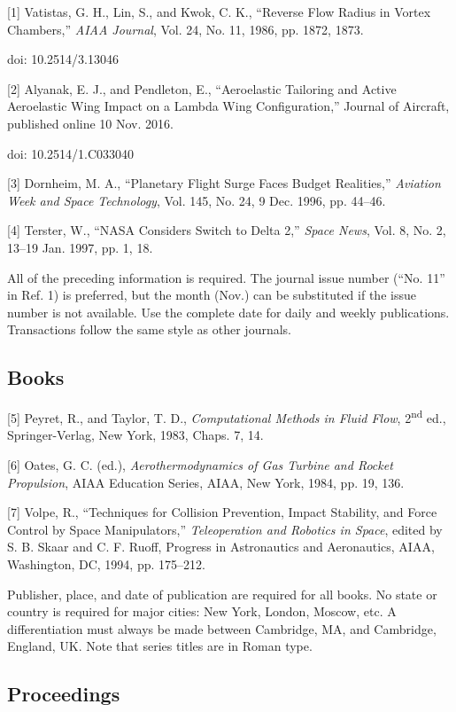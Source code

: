 \documentclass[
]{article}
\begin{document}
{[}1{]} Vatistas, G. H., Lin, S., and Kwok, C. K., ``Reverse Flow Radius
in Vortex Chambers,'' \emph{AIAA Journal}, Vol. 24, No. 11, 1986, pp.
1872, 1873.

doi: 10.2514/3.13046

{[}2{]} Alyanak, E. J., and Pendleton, E., ``Aeroelastic Tailoring and
Active Aeroelastic Wing Impact on a Lambda Wing Configuration,'' Journal
of Aircraft, published online 10 Nov. 2016.

doi: 10.2514/1.C033040

{[}3{]} Dornheim, M. A., ``Planetary Flight Surge Faces Budget
Realities,'' \emph{Aviation Week and Space Technology}, Vol. 145, No.
24, 9 Dec. 1996, pp. 44--46.

{[}4{]} Terster, W., ``NASA Considers Switch to Delta 2,'' \emph{Space
News}, Vol. 8, No. 2, 13--19 Jan. 1997, pp. 1, 18.

All of the preceding information is required. The journal issue number
(``No. 11'' in Ref. 1) is preferred, but the month (Nov.) can be
substituted if the issue number is not available. Use the complete date
for daily and weekly publications. Transactions follow the same style as
other journals.

\subsection{Books}\label{books}

{[}5{]} Peyret, R., and Taylor, T. D., \emph{Computational Methods in
Fluid Flow}, 2\textsuperscript{nd} ed., Springer-Verlag, New York, 1983,
Chaps. 7, 14.

{[}6{]} Oates, G. C. (ed.), \emph{Aerothermodynamics of Gas Turbine and
Rocket Propulsion}, AIAA Education Series, AIAA, New York, 1984, pp. 19,
136.

{[}7{]} Volpe, R., ``Techniques for Collision Prevention, Impact
Stability, and Force Control by Space Manipulators,''
\emph{Teleoperation and Robotics in Space}, edited by S. B. Skaar and C.
F. Ruoff, Progress in Astronautics and Aeronautics, AIAA, Washington,
DC, 1994, pp. 175--212.

Publisher, place, and date of publication are required for all books. No
state or country is required for major cities: New York, London, Moscow,
etc. A differentiation must always be made between Cambridge, MA, and
Cambridge, England, UK. Note that series titles are in Roman type.

\subsection{Proceedings}\label{proceedings}
\end{document}

